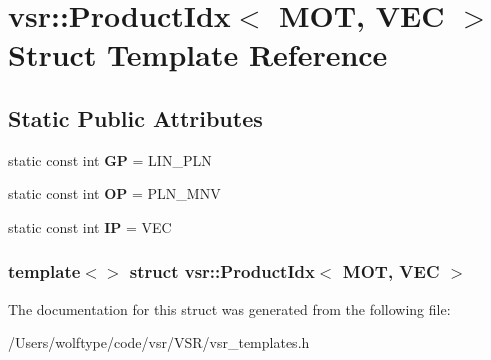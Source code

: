 \hypertarget{structvsr_1_1_product_idx_3_01_m_o_t_00_01_v_e_c_01_4}{\section{vsr\-:\-:Product\-Idx$<$ M\-O\-T, V\-E\-C $>$ Struct Template Reference}
\label{structvsr_1_1_product_idx_3_01_m_o_t_00_01_v_e_c_01_4}
}
\subsection*{Static Public Attributes}
\begin{DoxyCompactItemize}
\item 
\hypertarget{structvsr_1_1_product_idx_3_01_m_o_t_00_01_v_e_c_01_4_ad90663e6e53ecb4a39258e94e24d136f}{static const int {\bfseries G\-P} = L\-I\-N\-\_\-\-P\-L\-N}\label{structvsr_1_1_product_idx_3_01_m_o_t_00_01_v_e_c_01_4_ad90663e6e53ecb4a39258e94e24d136f}

\item 
\hypertarget{structvsr_1_1_product_idx_3_01_m_o_t_00_01_v_e_c_01_4_a3fbbc474e2fcefb915f4deabccf5237e}{static const int {\bfseries O\-P} = P\-L\-N\-\_\-\-M\-N\-V}\label{structvsr_1_1_product_idx_3_01_m_o_t_00_01_v_e_c_01_4_a3fbbc474e2fcefb915f4deabccf5237e}

\item 
\hypertarget{structvsr_1_1_product_idx_3_01_m_o_t_00_01_v_e_c_01_4_af6354099b25d52080d00a1f4c8701b0e}{static const int {\bfseries I\-P} = V\-E\-C}\label{structvsr_1_1_product_idx_3_01_m_o_t_00_01_v_e_c_01_4_af6354099b25d52080d00a1f4c8701b0e}

\end{DoxyCompactItemize}
\subsubsection*{template$<$$>$ struct vsr\-::\-Product\-Idx$<$ M\-O\-T, V\-E\-C $>$}



The documentation for this struct was generated from the following file\-:\begin{DoxyCompactItemize}
\item 
/\-Users/wolftype/code/vsr/\-V\-S\-R/vsr\-\_\-templates.\-h\end{DoxyCompactItemize}
